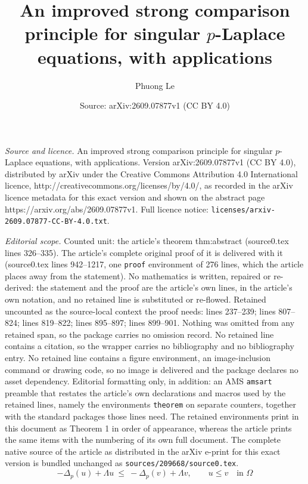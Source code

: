\documentclass[10pt,a4paper]{amsart}
\title{An improved strong comparison principle for singular $p$-Laplace equations, with applications}
\author{Phuong Le}
\date{Source: arXiv:2609.07877v1 (CC BY 4.0)}
\newcommand{\Lap}[1]{\Delta_{#1}}
\begin{document}
\maketitle

\noindent\emph{Source and licence.} An improved strong comparison principle for singular $p$-Laplace equations, with applications. Version arXiv:2609.07877v1 (CC BY 4.0), distributed by arXiv under the Creative Commons Attribution 4.0 International licence, http://creativecommons.org/licenses/by/4.0/, as recorded in the arXiv licence metadata for this exact version and shown on the abstract page https://arxiv.org/abs/2609.07877v1. Full licence notice: \texttt{licenses/arxiv-2609.07877-CC-BY-4.0.txt}.\par\smallskip

\noindent\textit{Editorial scope.} Counted unit: the article's theorem thm:abstract (source0.tex lines 326--335). The article's complete original proof of it is delivered with it (source0.tex lines 942--1217, one \texttt{proof} environment of 276 lines, which the article places away from the statement). No mathematics is written, repaired or re-derived: the statement and the proof are the article's own lines, in the article's own notation, and no retained line is substituted or re-flowed.  Retained uncounted as the source-local context the proof needs: lines 237--239; lines 807--824; lines 819--822; lines 895--897; lines 899--901.  Nothing was omitted from any retained span, so the package carries no omission record.  No retained line contains a citation, so the wrapper carries no bibliography and no bibliography entry.  No retained line contains a figure environment, an image-inclusion command or drawing code, so no image is delivered and the package declares no asset dependency.  Editorial formatting only, in addition: an AMS \texttt{amsart} preamble that restates the article's own declarations and macros used by the retained lines, namely the environments \texttt{theorem} on separate counters, together with the standard packages those lines need.  The retained environments print in this document as Theorem 1 in order of appearance, whereas the article prints the same items with the numbering of its own full document.  The complete native source of the article as distributed in the arXiv e-print for this exact version is bundled unchanged as \texttt{sources/209668/source0.tex}.
\begin{equation}\label{eq:scp-hyp}
-\Lap{p}(u)+\Lambda u\ \le\ -\Lap{p}(v)+\Lambda v,\qquad u\le v\quad\text{in }\Omega
\end{equation}
\end{document}
